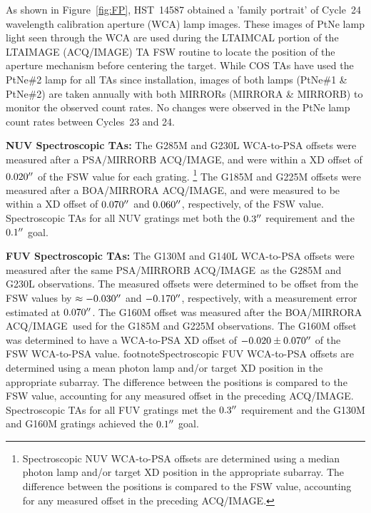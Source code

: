 \documentclass[12pt]{reportj}
\def\arcsec{\hbox{$^{\prime\prime}$}}
\newcommand*{\myfont}{\fontfamily{rm}\selectfont}
\def\acqimage{{\myfont ACQ/IMAGE}\rm}
\begin{document}
\begin{description}
	As shown in Figure~\ref{fig:FP}, HST~14587 obtained a 'family portrait' of Cycle~24 wavelength calibration aperture (WCA) lamp images. These images of PtNe lamp light seen through the WCA
	are used during the LTAIMCAL portion of the LTAIMAGE (ACQ/IMAGE) TA FSW routine to locate the position of the aperture mechanism before centering the target.
	While COS TAs have used the PtNe\#2 lamp for all TAs since installation, images of both lamps (PtNe\#1 \& PtNe\#2) are taken annually with both MIRRORs
	(MIRRORA \& MIRRORB) to monitor the observed count rates. No changes were observed in the PtNe lamp count rates between Cycles~23 and 24.
	\clearpage
\item{\bf NUV Spectroscopic TAs:}
	The G285M and G230L WCA-to-PSA offsets were measured after a PSA/MIRRORB \acqimage, and were within a XD offset of $0.020\arcsec$ of the FSW value for each grating.
	\footnote{Spectroscopic NUV WCA-to-PSA offsets are determined using a median photon lamp and/or target XD position in the appropriate subarray. The difference between the positions is compared to the FSW value, accounting for any measured offset in the preceding \acqimage.}
	The G185M and G225M offsets were measured after a BOA/MIRRORA \acqimage, and were measured to be within a XD offset of $0.070\arcsec$ and $0.060\arcsec$, respectively, of the FSW value.
	Spectroscopic TAs for all NUV gratings met both the $0.3\arcsec$ requirement and the $0.1\arcsec$ goal.
\item{\bf FUV Spectroscopic TAs:}
	The G130M and G140L WCA-to-PSA offsets were measured after the same PSA/MIRRORB \acqimage~as the G285M and G230L observations.
	The measured offsets were determined to be offset from the FSW values by $\approx -0.030\arcsec$ and $-0.170\arcsec$, respectively, with a measurement error estimated at $0.070\arcsec$.
	The G160M offset was measured after the BOA/MIRRORA \acqimage~used for the G185M and G225M observations. The G160M offset was determined to have a WCA-to-PSA XD offset of $-0.020 \pm 0.070\arcsec$ of the FSW WCA-to-PSA value.
footnote{Spectroscopic FUV WCA-to-PSA offsets are determined using a mean photon lamp and/or target XD position in the appropriate subarray. The difference between the positions is compared to the FSW value, accounting for any measured offset in the preceding \acqimage.}
	Spectroscopic TAs for all FUV gratings met the $0.3\arcsec$ requirement and the G130M and G160M gratings achieved the $0.1\arcsec$ goal.
	\begin{figure}[!h]
	\vspace{1.3cm}

\end{figure}
\end{description}
\end{document}
